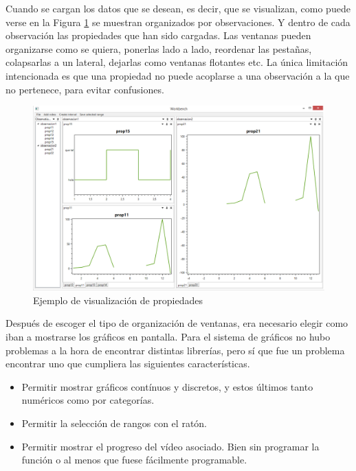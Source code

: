 Cuando se cargan los datos que se desean, es decir, que se visualizan, como puede verse en la
Figura \ref{fig:EjemploObservacion} se muestran organizados por observaciones. Y dentro de cada
observaci\'on las propiedades que han sido cargadas. Las ventanas pueden organizarse como se quiera, ponerlas lado a lado,
reordenar las pesta\~nas, colapsarlas a un lateral, dejarlas como ventanas flotantes etc. 
La \'unica limitaci\'on intencionada es que una propiedad no puede acoplarse a una observaci\'on a la que no pertenece,
para evitar confusiones.

\begin{figure}[h]
	\centering
	\includegraphics[width=0.9\linewidth]{./Figures/Capturas/EjemploObservacion.PNG}
	\caption{Ejemplo de visualizaci\'on de propiedades}
	\label{fig:EjemploObservacion}
\end{figure}

Despu\'es de escoger el tipo de organizaci\'on de ventanas, era necesario elegir como iban a mostrarse los gr\'aficos en pantalla.
Para el sistema de gr\'aficos no hubo problemas a la hora de encontrar distintas librer\'ias, pero s\'i que fue un 
problema encontrar uno que cumpliera las siguientes caracter\'isticas.

\begin{itemize}
	\item Permitir mostrar gr\'{a}ficos cont\'{i}nuos y discretos, y estos \'{u}ltimos tanto num\'{e}ricos como por categor\'{i}as.
	\item Permitir la selecci\'{o}n de rangos con el rat\'{o}n.
	\item Permitir mostrar el progreso del v\'{i}deo asociado. Bien sin programar la funci\'{o}n o al menos que fuese f\'{a}cilmente programable.
\end{itemize}

